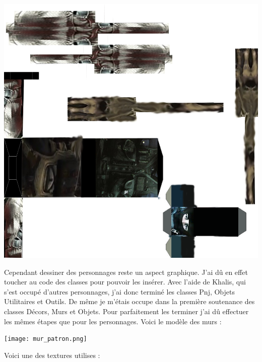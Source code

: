 \documentclass{article}
\begin{document}
\begin{center}
\includegraphics[scale=0.2]{ennemidehors.png}
\end{center}
\par
Cependant dessiner des personnages reste un aspect graphique. J’ai dû en effet toucher au code des classes pour pouvoir les insérer. Avec l’aide de Khalis, qui s’est occupé d’autres personnages, j’ai donc terminé les classes Pnj, Objets Utilitaires et Outils.
De même je m’étais occupe dans la première soutenance des classes Décors, Murs et Objets. Pour parfaitement les terminer j’ai dû effectuer les mêmes étapes que pour les personnages.
\newpage
Voici le modèle des murs :
\begin{center}
\texttt{[image: mur\_patron.png]}
\end{center}
Voici une des textures utilises :
\end{document}

